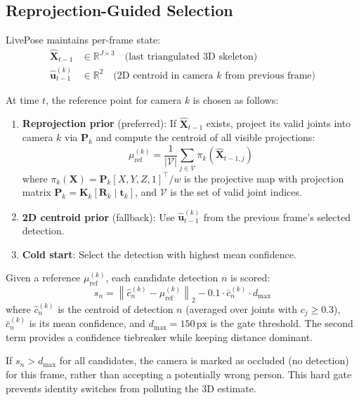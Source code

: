 \documentclass[11pt,a4paper]{article}
\newcommand{\R}{\mathbb{R}}
\newcommand{\norm}[1]{\left\lVert#1\right\rVert}
\begin{document}
\subsection{Reprojection-Guided Selection}

LivePose maintains per-frame state:
\begin{align*}
  \hat{\mathbf{X}}_{t-1} &\in \R^{J \times 3} \quad \text{(last triangulated 3D skeleton)}\\
  \hat{\mathbf{u}}^{(k)}_{t-1} &\in \R^2 \quad \text{(2D centroid in camera } k\text{ from previous frame)}
\end{align*}

At time $t$, the reference point for camera $k$ is chosen as follows:
\begin{enumerate}
  \item \textbf{Reprojection prior} (preferred): If $\hat{\mathbf{X}}_{t-1}$ exists,
    project its valid joints into camera $k$ via $\mathbf{P}_k$ and compute the
    centroid of all visible projections:
    \[
      \mu^{(k)}_\text{ref} = \frac{1}{|\mathcal{V}|}\sum_{j \in \mathcal{V}}
      \pi_k\!\left(\hat{\mathbf{X}}_{t-1,j}\right)
    \]
    where $\pi_k(\mathbf{X}) = \mathbf{P}_k [X, Y, Z, 1]^\top / w$ is the projective
    map with projection matrix $\mathbf{P}_k = \mathbf{K}_k[\mathbf{R}_k \mid
    \mathbf{t}_k]$, and $\mathcal{V}$ is the set of valid joint indices.
  \item \textbf{2D centroid prior} (fallback): Use $\hat{\mathbf{u}}^{(k)}_{t-1}$
    from the previous frame's selected detection.
  \item \textbf{Cold start}: Select the detection with highest mean confidence.
\end{enumerate}

Given a reference $\mu^{(k)}_\text{ref}$, each candidate detection $n$ is scored:
\begin{equation}
  s_n = \norm{\hat{c}^{(k)}_n - \mu^{(k)}_\text{ref}}_2
        - 0.1 \cdot \bar{c}^{(k)}_n \cdot d_\text{max}
  \label{eq:selection_score}
\end{equation}
where $\hat{c}^{(k)}_n$ is the centroid of detection $n$ (averaged over joints with
$c_j \geq 0.3$), $\bar{c}^{(k)}_n$ is its mean confidence, and $d_\text{max} =
150\,\text{px}$ is the gate threshold. The second term provides a confidence tiebreaker
while keeping distance dominant.

If $s_n > d_\text{max}$ for all candidates, the camera is marked as occluded (no
detection) for this frame, rather than accepting a potentially wrong person. This hard
gate prevents identity switches from polluting the 3D estimate.
\end{document}
